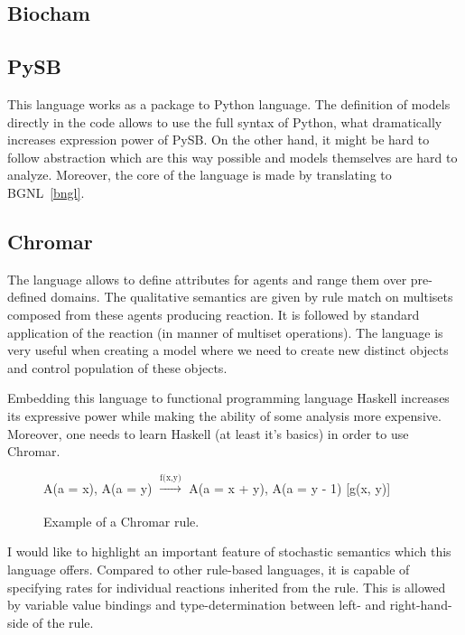 \documentclass[12pt]{fithesis2}
\begin{document}
\subsection{Biocham}

\subsection{PySB}

This language works as a package to Python language. The definition of models directly in the code allows to use the full syntax of Python, what dramatically increases expression power of PySB. On the other hand, it might be hard to follow abstraction which are this way possible and models themselves are hard to analyze. Moreover, the core of the language is made by translating to BGNL~\ref{bngl}.

\subsection{Chromar}

The language allows to define attributes for agents and range them over pre-defined domains. The qualitative semantics are given by rule match on multisets composed from these agents producing reaction. It is followed by standard application of the reaction (in manner of multiset operations). The language is very useful when creating a model where we need to create new distinct objects and control population of these objects.

Embedding this language to functional programming language Haskell increases its expressive power while making the ability of some analysis more expensive. Moreover, one needs to learn Haskell (at least it's basics) in order to use Chromar.

\begin{figure}
\begin{center}
A(a = x), A(a = y) $\xrightarrow[]{\text{f(x,y)}}$ A(a = x + y), A(a = y - 1) [g(x, y)]
\end{center}
\caption{Example of a Chromar rule.}\label{chromar-rule}
\end{figure}

I would like to highlight an important feature of stochastic semantics which this language offers. Compared to other rule-based languages, it is capable of specifying rates for individual reactions inherited from the rule. This is allowed by variable value bindings and type-determination between left- and right-hand-side of the rule.
\end{document}
